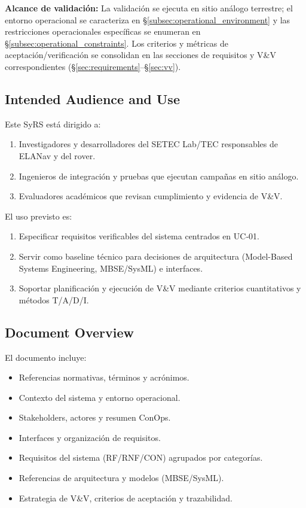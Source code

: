 \textbf{Alcance de validación:} La validación se ejecuta en sitio análogo terrestre; el entorno operacional se caracteriza en §\ref{subsec:operational_environment} y las restricciones operacionales específicas se enumeran en §\ref{subsec:operational_constraints}. Los criterios y métricas de aceptación/verificación se consolidan en las secciones de requisitos y V\&V correspondientes (§\ref{sec:requirements}–§\ref{sec:vv}). \cite{nasa_se_handbook}

\subsection{Intended Audience and Use}

Este SyRS está dirigido a:
\begin{enumerate}[label=\alph*)]
    \item Investigadores y desarrolladores del SETEC Lab/TEC responsables de ELANav y del rover.
    \item Ingenieros de integración y pruebas que ejecutan campañas en sitio análogo.
    \item Evaluadores académicos que revisan cumplimiento y evidencia de V\&V. \cite{ieee_29148}
\end{enumerate}

El uso previsto es:
\begin{enumerate}
    \item Especificar requisitos verificables del sistema centrados en UC‑01.
    \item Servir como baseline técnico para decisiones de arquitectura (Model-Based Systems Engineering, MBSE/SysML) e interfaces.
    \item Soportar planificación y ejecución de V\&V mediante criterios cuantitativos y métodos T/A/D/I. \cite{nasa_se_handbook, segoldmine_ppi}
\end{enumerate}

\subsection{Document Overview}

El documento incluye:
\begin{itemize}
    \item Referencias normativas, términos y acrónimos.
    \item Contexto del sistema y entorno operacional.
    \item Stakeholders, actores y resumen ConOps.
    \item Interfaces y organización de requisitos.
    \item Requisitos del sistema (RF/RNF/CON) agrupados por categorías.
    \item Referencias de arquitectura y modelos (MBSE/SysML).
    \item Estrategia de V\&V, criterios de aceptación y trazabilidad. \cite{ieee_29148}
\end{itemize}

